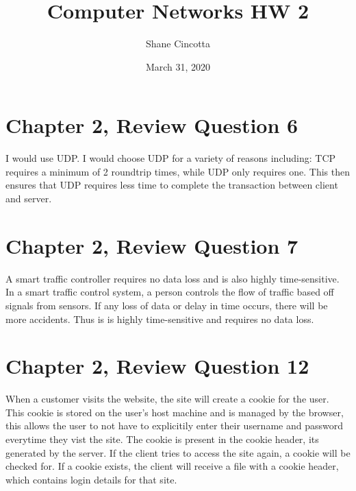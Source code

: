 \documentclass{article}
\title{Computer Networks HW 2}
\author{Shane Cincotta }
\date{March 31, 2020}
\begin{document}
\maketitle

\section{Chapter 2, Review Question 6}
I would use UDP.  I would choose UDP for a variety of reasons including: TCP requires a minimum of 2 roundtrip times, while UDP only requires one.  This then ensures that UDP requires less time to complete the transaction between client and server.\\

\section{Chapter 2, Review Question 7}
A smart traffic controller requires no data loss and is also highly time-sensitive.  In a smart traffic control system, a person controls the flow of traffic based off signals from sensors.  If any loss of data or delay in time occurs, there will be more accidents.  Thus is is highly time-sensitive and requires no data loss.\\

\section{Chapter 2, Review Question 12}
When a customer visits the website, the site will create a cookie for the user.  This cookie is stored on the user's host machine and is managed by the browser, this allows the user to not have to explicitily enter their username and password everytime they vist the site.  The cookie is present in the cookie header, its generated by the server.  If the client tries to access the site again, a cookie will be checked for.  If a cookie exists, the client will receive a file with a cookie header, which contains login details for that site.\\
\end{document}
